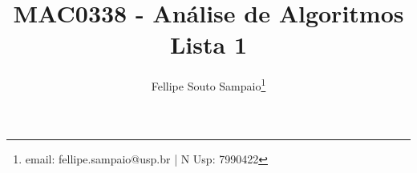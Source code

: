 \title{MAC0338 - Análise de Algoritmos \\ \vspace{10px} \LARGE{Lista 1}}
\author{Fellipe Souto Sampaio\footnote{email: fellipe.sampaio@usp.br | N Usp: 7990422}}
\maketitle
